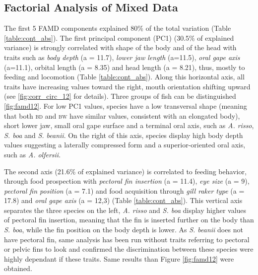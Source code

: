 
\subsection{Factorial Analysis of Mixed Data}
The first 5 FAMD components explained 80\% of the total variation (Table \ref{table:cont_abs}). The first principal component (PC1) (30.5\% of explained variance) is strongly correlated with shape of the body and of the head with traits such as \emph{body depth} (a = 11.7), \emph{lower jaw length} (a=11.5), \emph{oral gape axis} (a=11.1), orbital length (a = 8.35) and head length (a = 8.21), thus, mostly to feeding and locomotion (Table \ref{table:cont_abs}). Along this horizontal axis, all traits have increasing values toward the right, mouth orientation shifting upward (see \ref{fig:corr_circ_12} for details). Three groups of fish can be distinguished \ref{fig:famd12}. For low PC1 values, species have a low transversal shape (meaning that both \textsc{bd} and \textsc{bw} have similar values, consistent with an elongated body), short lower jaw, small oral gape surface and a terminal oral axis, such as \textit{A. risso}, \textit{S. boa} and \textit{S. beanii}. On the right of this axis, species display high body depth values suggesting a laterally compressed form and a superior-oriented oral axis, such as \textit{A. olfersii}. 

The second axis (21.6\% of explained variance) is correlated to feeding behavior, through food prospection with \emph{pectoral fin insertion} (a = 11.4), \emph{eye size} (a = 9), \emph{pectoral fin position} (a = 7.1) and food acquisition through \emph{gill raker type} (a = 17.8) and \emph{oral gape axis} (a = 12,3) (Table \ref{table:cont_abs}). This vertical axis separates the three species on the left, \textit{A. risso} and \textit{S. boa} display higher values of pectoral fin insertion, meaning that the fin is inserted further on the body than \textit{S. boa}, while the fin position on the body depth is lower. As \textit{S. beanii} does not have pectoral fin, same analysis has been run without traits referring to pectoral or pelvic fins to look and confirmed the discrimination between these species were highly dependant if these traits. Same results than Figure \ref{fig:famd12} were obtained.

